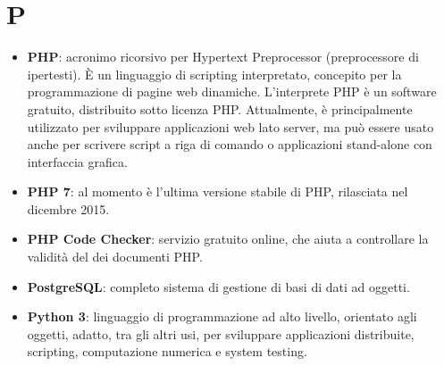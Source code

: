 \section{P}
\begin{itemize} 
	\item \textbf{PHP}: acronimo ricorsivo per Hypertext Preprocessor (preprocessore di ipertesti). \MakeUppercase{è} un linguaggio di scripting interpretato, concepito per la programmazione di pagine web dinamiche. L'interprete PHP è un software gratuito, distribuito sotto licenza PHP. Attualmente, è principalmente utilizzato per sviluppare applicazioni web lato server, ma può essere usato anche per scrivere script a riga di comando o applicazioni stand-alone con interfaccia grafica.
	\item \textbf{PHP 7}: al momento è l'ultima versione stabile di PHP, rilasciata nel dicembre 2015.
	\item \textbf{PHP Code Checker}: servizio gratuito online, che aiuta a controllare la validità del dei documenti PHP.
	\item \textbf{PostgreSQL}: completo sistema di gestione di basi di dati ad oggetti.
	\item \textbf{Python 3}: linguaggio di programmazione ad alto livello, orientato agli oggetti, adatto, tra gli altri usi, per sviluppare applicazioni distribuite, scripting, computazione numerica e system testing.
\end{itemize}

